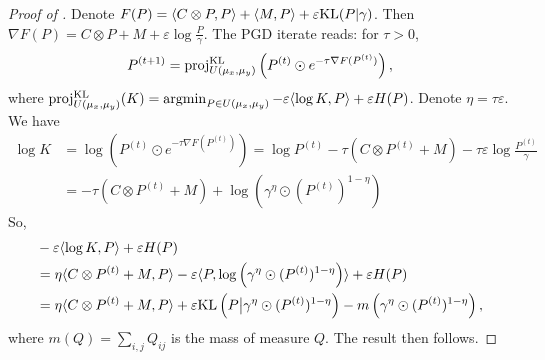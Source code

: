 \begin{proof}[Proof of ]
  Denote $F(P) = \langle C \otimes P, P \rangle + \langle M, P \rangle + \varepsilon \text{KL}(P | \gamma)$.
  Then $\nabla F(P) = C \otimes P + M + \varepsilon \log \frac{P}{\gamma}$.
  The PGD iterate reads: for $\tau > 0$,
  \begin{align}
    P^{(t+1)} = \text{proj}^{\text{KL}}_{U(\mu_x, \mu_y)}
    \left( P^{(t)} \odot e^{-\tau \nabla F(P^{(t)})} \right),
  \end{align}
  where $\text{proj}^{\text{KL}}_{U(\mu_x, \mu_y)}(K) =
  \operatorname*{argmin}_{P \in U(\mu_x, \mu_y)} - \varepsilon \langle \log K, P \rangle + \varepsilon H(P)$.
  Denote $\eta = \tau \varepsilon$. We have
  \begin{align}
    \log K &= \log \left( P^{(t)} \odot e^{-\tau \nabla F(P^{(t)})} \right) =
    \log P^{(t)} - \tau (C \otimes P^{(t)} + M)  - \tau \varepsilon \log \frac{P^{(t)}}{\gamma} \\
    &= - \tau (C \otimes P^{(t)} + M) + \log \left( \gamma^{\eta} \odot (P^{(t)})^{1 - \eta} \right)
  \end{align}
  So,
  \begin{align}
    &- \varepsilon \langle \log K, P \rangle + \varepsilon H(P) \\
    &= \eta \langle C \otimes P^{(t)} + M, P \rangle
    - \varepsilon \langle P, \log \left( \gamma^{\eta} \odot (P^{(t)})^{1 - \eta} \right) \rangle
    + \varepsilon H(P) \\
    &= \eta \langle C \otimes P^{(t)} + M, P \rangle +
    \varepsilon \text{KL} \left( P \big | \gamma^{\eta} \odot (P^{(t)})^{1 - \eta} \right)
    - m \left( \gamma^{\eta} \odot (P^{(t)})^{1 - \eta} \right),
  \end{align}
  where $m(Q) = \sum_{i,j} Q_{ij}$ is the mass of measure $Q$. The result then follows.
\end{proof}

